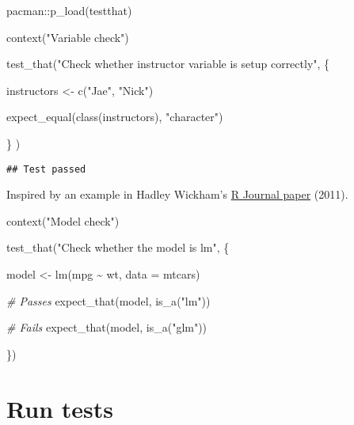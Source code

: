 \documentclass[
]{book}
\newenvironment{Shaded}{\begin{snugshade}}{\end{snugshade}}
\newcommand{\AttributeTok}[1]{\textcolor[rgb]{0.77,0.63,0.00}{#1}}
\newcommand{\CommentTok}[1]{\textcolor[rgb]{0.56,0.35,0.01}{\textit{#1}}}
\newcommand{\FunctionTok}[1]{\textcolor[rgb]{0.00,0.00,0.00}{#1}}
\newcommand{\NormalTok}[1]{#1}
\newcommand{\OtherTok}[1]{\textcolor[rgb]{0.56,0.35,0.01}{#1}}
\newcommand{\SpecialCharTok}[1]{\textcolor[rgb]{0.00,0.00,0.00}{#1}}
\newcommand{\StringTok}[1]{\textcolor[rgb]{0.31,0.60,0.02}{#1}}
\begin{document}
\begin{Shaded}
\begin{Highlighting}[]
\NormalTok{pacman}\SpecialCharTok{::}\FunctionTok{p\_load}\NormalTok{(testthat)}

\FunctionTok{context}\NormalTok{(}\StringTok{"Variable check"}\NormalTok{)}

\FunctionTok{test\_that}\NormalTok{(}\StringTok{"Check whether instructor variable is setup correctly"}\NormalTok{, \{}
  
\NormalTok{  instructors }\OtherTok{\textless{}{-}} \FunctionTok{c}\NormalTok{(}\StringTok{"Jae"}\NormalTok{, }\StringTok{"Nick"}\NormalTok{)}

  \FunctionTok{expect\_equal}\NormalTok{(}\FunctionTok{class}\NormalTok{(instructors), }\StringTok{"character"}\NormalTok{)}

\NormalTok{\}}
\NormalTok{)}
\end{Highlighting}
\end{Shaded}

\begin{verbatim}
## Test passed
\end{verbatim}

Inspired by an example in Hadley Wickham's \href{https://journal.r-project.org/archive/2011-1/RJournal_2011-1_Wickham.pdf}{R Journal paper} (2011).

\begin{Shaded}
\begin{Highlighting}[]
\FunctionTok{context}\NormalTok{(}\StringTok{"Model check"}\NormalTok{)}

\FunctionTok{test\_that}\NormalTok{(}\StringTok{"Check whether the model is lm"}\NormalTok{, \{}
  
\NormalTok{  model }\OtherTok{\textless{}{-}} \FunctionTok{lm}\NormalTok{(mpg }\SpecialCharTok{\textasciitilde{}}\NormalTok{ wt, }\AttributeTok{data =}\NormalTok{ mtcars)}
  
  \CommentTok{\# Passes}
  \FunctionTok{expect\_that}\NormalTok{(model, }\FunctionTok{is\_a}\NormalTok{(}\StringTok{"lm"}\NormalTok{))}

  \CommentTok{\# Fails}
  \FunctionTok{expect\_that}\NormalTok{(model, }\FunctionTok{is\_a}\NormalTok{(}\StringTok{"glm"}\NormalTok{))}

\NormalTok{\})}
\end{Highlighting}
\end{Shaded}

\hypertarget{run-tests}{%
\section{Run tests}\label{run-tests}}
\end{document}
